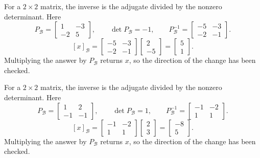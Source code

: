 For a $2\times2$ matrix, the inverse is the adjugate divided by the nonzero determinant. Here
\[P_{\mathcal B}=\left[\begin{array}{rr}1&-3\\-2&5\end{array}\right],\qquad\det P_{\mathcal B}=-1,\qquad P_{\mathcal B}^{-1}=\left[\begin{array}{rr}-5&-3\\-2&-1\end{array}\right].\]
\[[x]_{\mathcal B}=\left[\begin{array}{rr}-5&-3\\-2&-1\end{array}\right]\left[\begin{array}{r}2\\-5\end{array}\right]=\left[\begin{array}{r}5\\1\end{array}\right].\]
Multiplying the answer by $P_{\mathcal B}$ returns $x$, so the direction of the change has been checked.

For a $2\times2$ matrix, the inverse is the adjugate divided by the nonzero determinant. Here
\[P_{\mathcal B}=\left[\begin{array}{rr}1&2\\-1&-1\end{array}\right],\qquad\det P_{\mathcal B}=1,\qquad P_{\mathcal B}^{-1}=\left[\begin{array}{rr}-1&-2\\1&1\end{array}\right].\]
\[[x]_{\mathcal B}=\left[\begin{array}{rr}-1&-2\\1&1\end{array}\right]\left[\begin{array}{r}2\\3\end{array}\right]=\left[\begin{array}{r}-8\\5\end{array}\right].\]
Multiplying the answer by $P_{\mathcal B}$ returns $x$, so the direction of the change has been checked.

